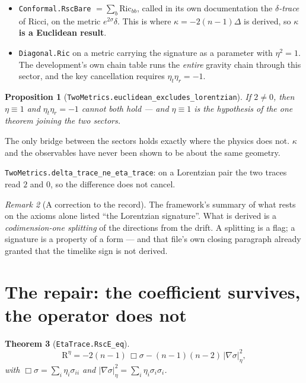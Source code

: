 \documentclass[11pt,a4paper]{article}
\newtheorem{theorem}{Theorem}[section]
\newtheorem{proposition}[theorem]{Proposition}
\theoremstyle{definition}
\theoremstyle{remark}
\newtheorem{remark}[theorem]{Remark}
\newcommand{\lean}[1]{\texttt{\small #1}}
\newcommand{\Ric}{\mathrm{Ric}}
\newcommand{\Rsc}{\mathrm{R}}
\newcommand{\sg}{\sigma}
\begin{document}
\begin{itemize}[leftmargin=1.4em]
\item \lean{Conformal.RscBare} $=\sum_b\Ric_{bb}$, called in its own documentation
      the \emph{$\delta$-trace} of Ricci, on the metric $e^{2\sg}\delta$. This is
      where $\kappa=-2(n-1)\Delta$ is derived, so \textbf{$\kappa$ is a Euclidean
      result}.
\item \lean{Diagonal.Ric} on a metric carrying the signature as a parameter with
      $\eta^{2}=1$. The development's own chain table runs the \emph{entire}
      gravity chain through this sector, and the key cancellation requires
      $\eta_t\eta_r=-1$.
\end{itemize}

\begin{proposition}[\lean{TwoMetrics.euclidean\_excludes\_lorentzian}]
If $2\neq0$, then $\eta\equiv1$ and $\eta_t\eta_r=-1$ cannot both hold --- and
$\eta\equiv1$ is the hypothesis of the one theorem joining the two sectors.
\end{proposition}

\begin{claimbox}
The only bridge between the sectors holds exactly where the physics does not.
$\kappa$ and the observables have never been shown to be about the same geometry.
\end{claimbox}

\lean{TwoMetrics.delta\_trace\_ne\_eta\_trace}: on a Lorentzian pair the two traces
read $2$ and $0$, so the difference does not cancel.

\begin{remark}[A correction to the record]
The framework's summary of what rests on the axioms alone listed ``the Lorentzian
signature''. What is derived is a \emph{codimension-one splitting} of the
directions from the drift. A splitting is a flag; a signature is a property of a
form --- and that file's own closing paragraph already granted that the timelike
sign is not derived.
\end{remark}

\section{The repair: the coefficient survives, the operator does not}
\label{sec:etatrace}

\begin{theorem}[\lean{EtaTrace.RscE\_eq}]
\[
  \Rsc^{\eta}=-2(n-1)\,\Box\sg-(n-1)(n-2)\,|\nabla\sg|^{2}_{\eta},
\]
with $\Box\sg=\sum_i\eta_i\sg_{ii}$ and
$|\nabla\sg|^{2}_{\eta}=\sum_i\eta_i\sg_i\sg_i$.
\end{theorem}
\end{document}

